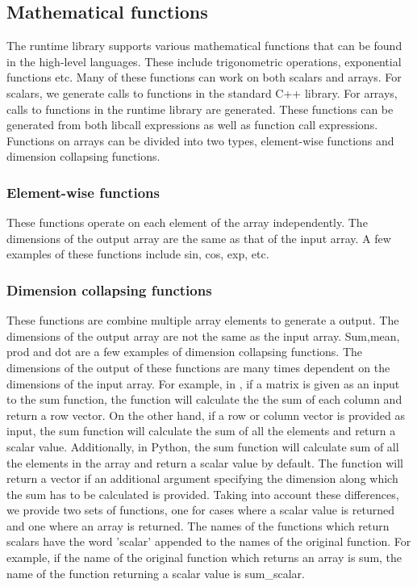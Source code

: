 \subsection{Mathematical functions} 
The runtime library supports various mathematical functions that can be found in the high-level languages. These include trigonometric operations, exponential functions etc. Many of these functions can work on both scalars and arrays. For scalars, we generate calls to functions in the standard C++ library. For arrays, calls to functions in the runtime library are generated. These functions can be generated from both libcall expressions as well as function call expressions.  Functions on arrays can be divided into two types, element-wise functions and dimension collapsing functions. 
\subsubsection{Element-wise functions}
These functions operate on each element of the array independently. The dimensions of the output array are the same as that of the input array. A few examples of these functions include \textsf{sin}, \textsf{cos}, \textsf{exp}, etc. 
\subsubsection{Dimension collapsing functions}
These functions are combine multiple array elements to generate a output. The dimensions of the output array are not the same as the input array. \textsf{Sum},\textsf{mean}, \textsf{prod} and \textsf{dot} are a few examples of dimension collapsing functions. The dimensions of the output of these functions are many times dependent on the dimensions of the input array. For example, in \matlab, if a matrix is given as an input to the \textsf{sum} function, the function will calculate the the sum of each column and return a row vector. On the other hand, if a row or column vector is provided as input, the sum function will calculate the sum of all the elements and return a scalar value. Additionally, in Python, the \textsf{sum} function will calculate sum of all the elements in the array and return a scalar value by default. The function will return a vector if an additional argument specifying the dimension along which the sum has to be calculated is provided. Taking into account these differences, we provide two sets of functions, one for cases where a scalar value is returned and one where an array is returned. The names of the functions which return scalars have the word 'scalar' appended to the names of the original function. For example, if the name of the original function  which returns an array is \textsf{sum}, the name of the function returning a scalar value is \textsf{sum\_scalar}.
